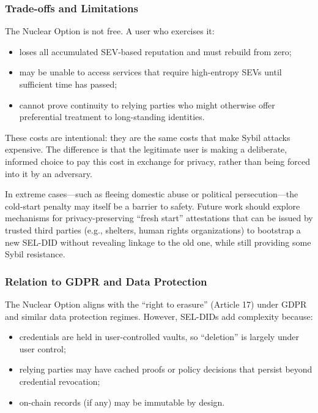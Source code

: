 \documentclass[11pt]{article}
\begin{document}
\subsubsection{Trade-offs and Limitations}

The Nuclear Option is not free. A user who exercises it:

\begin{itemize}
  \item loses all accumulated SEV-based reputation and must rebuild from zero;
  \item may be unable to access services that require high-entropy SEVs until sufficient time has passed;
  \item cannot prove continuity to relying parties who might otherwise offer preferential treatment to long-standing identities.
\end{itemize}

These costs are intentional: they are the same costs that make Sybil attacks expensive. The difference is that the legitimate user is making a deliberate, informed choice to pay this cost in exchange for privacy, rather than being forced into it by an adversary.

In extreme cases---such as fleeing domestic abuse or political persecution---the cold-start penalty may itself be a barrier to safety. Future work should explore mechanisms for privacy-preserving ``fresh start'' attestations that can be issued by trusted third parties (e.g., shelters, human rights organizations) to bootstrap a new SEL-DID without revealing linkage to the old one, while still providing some Sybil resistance.

\subsubsection{Relation to GDPR and Data Protection}

The Nuclear Option aligns with the ``right to erasure'' (Article 17) under GDPR and similar data protection regimes. However, SEL-DIDs add complexity because:

\begin{itemize}
  \item credentials are held in user-controlled vaults, so ``deletion'' is largely under user control;
  \item relying parties may have cached proofs or policy decisions that persist beyond credential revocation;
  \item on-chain records (if any) may be immutable by design.
\end{itemize}
\end{document}
